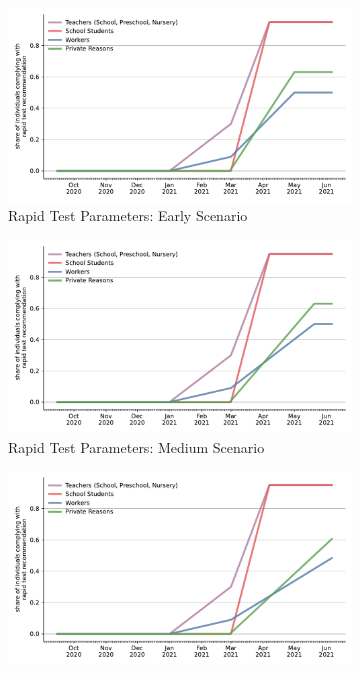 \begin{figure}[ht] %
    \centering
    \begin{subfigure}[b]{0.3\textwidth}
        \includegraphics[width=\textwidth]{figures/results/figures/data/testing/rapid_test_demand/robustness_check_params_early_shares}
        \caption{Rapid Test Parameters: Early Scenario}
        \label{fig:robustness_early_params}
    \end{subfigure}
    \hfill
    \begin{subfigure}[b]{0.3\textwidth}
        \includegraphics[width=\textwidth]{figures/results/figures/data/testing/rapid_test_demand/robustness_check_params_medium_shares}
        \caption{Rapid Test Parameters: Medium Scenario}
        \label{fig:robustness_medium_params}
    \end{subfigure}
    \hfill
    \begin{subfigure}[b]{0.3\textwidth}
        \includegraphics[width=\textwidth]{figures/results/figures/data/testing/rapid_test_demand/robustness_check_params_late_shares}

\end{subfigure}
\end{figure}
